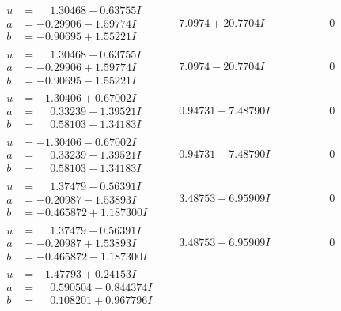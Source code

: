 \documentclass[1p]{elsarticle_modified}
\theoremstyle{definition}
\begin{document}
$$\begin{array}{c|c|c}
 \hline 
\begin{aligned}
u &= \phantom{-}1.30468 + 0.63755 I \\
a &= -0.29906 - 1.59774 I \\
b &= -0.90695 + 1.55221 I\end{aligned}
 & \phantom{-}7.0974 + 20.7704 I & \phantom{-0.000000 } 0 \\ \hline\begin{aligned}
u &= \phantom{-}1.30468 - 0.63755 I \\
a &= -0.29906 + 1.59774 I \\
b &= -0.90695 - 1.55221 I\end{aligned}
 & \phantom{-}7.0974 - 20.7704 I & \phantom{-0.000000 } 0 \\ \hline\begin{aligned}
u &= -1.30406 + 0.67002 I \\
a &= \phantom{-}0.33239 - 1.39521 I \\
b &= \phantom{-}0.58103 + 1.34183 I\end{aligned}
 & \phantom{-}0.94731 - 7.48790 I & \phantom{-0.000000 } 0 \\ \hline\begin{aligned}
u &= -1.30406 - 0.67002 I \\
a &= \phantom{-}0.33239 + 1.39521 I \\
b &= \phantom{-}0.58103 - 1.34183 I\end{aligned}
 & \phantom{-}0.94731 + 7.48790 I & \phantom{-0.000000 } 0 \\ \hline\begin{aligned}
u &= \phantom{-}1.37479 + 0.56391 I \\
a &= -0.20987 - 1.53893 I \\
b &= -0.465872 + 1.187300 I\end{aligned}
 & \phantom{-}3.48753 + 6.95909 I & \phantom{-0.000000 } 0 \\ \hline\begin{aligned}
u &= \phantom{-}1.37479 - 0.56391 I \\
a &= -0.20987 + 1.53893 I \\
b &= -0.465872 - 1.187300 I\end{aligned}
 & \phantom{-}3.48753 - 6.95909 I & \phantom{-0.000000 } 0 \\ \hline\begin{aligned}
u &= -1.47793 + 0.24153 I \\
a &= \phantom{-}0.590504 - 0.844374 I \\
b &= \phantom{-}0.108201 + 0.967796 I\end{aligned}

\end{array}$$
\end{document}
